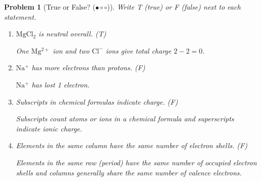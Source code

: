 \documentclass[a4paper,11pt]{article}
\newcommand{\easy}{(\ensuremath{\bullet \circ \circ})}
\theoremstyle{listprobstyle}
\newtheorem{problem}{Problem}
\newenvironment{solution}
    {\par\begingroup\color{BrickRed}}
    {\par\endgroup}
\begin{document}
\begin{problem}[True or False? \easy]
Write T (true) or F (false) next to each statement.
\vspace{-0.6\baselineskip}
\begin{enumerate}[label=\alph*),itemsep=0pt,parsep=0pt,topsep=0pt]
\item $\mathrm{MgCl_2}$ is neutral overall.
    (\textcolor{BrickRed}{T})
    \begin{solution}
    One $\mathrm{Mg^{2+}}$ ion and two $\mathrm{Cl^-}$
    ions give total charge $2 - 2=0$.
    \end{solution}
\vspace{0.5\baselineskip}
\item $\mathrm{Na^+}$ has more electrons than protons.
    (\textcolor{BrickRed}{F})
    \begin{solution}
    $\mathrm{Na^+}$ has lost 1 electron.
    \end{solution}
\vspace{0.5\baselineskip}
\item Subscripts in chemical formulas indicate charge.
    (\textcolor{BrickRed}{F})
    \begin{solution}
    Subscripts count atoms or ions in a chemical formula and
    superscripts indicate ionic charge.
    \end{solution}
\vspace{0.5\baselineskip}
\item Elements in the same column have the same number of electron
    shells.
    (\textcolor{BrickRed}{F})
    \begin{solution}
    Elements in the same row (period) have the same number of occupied
    electron shells and columns generally share the same number of
    valence electrons.
    \end{solution}
\end{enumerate}
\end{problem}
\end{document}
